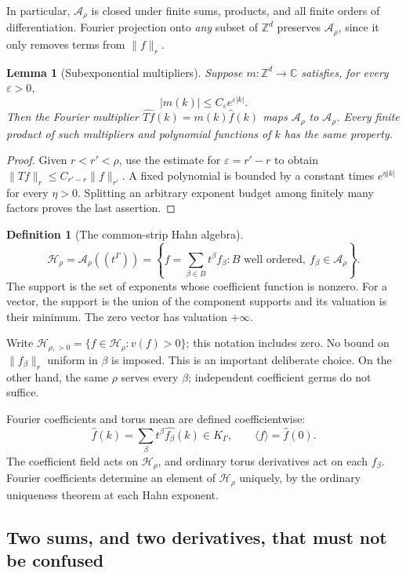 \documentclass[11pt,letterpaper]{article}
\newtheorem{lemma}[theorem]{Lemma}
\theoremstyle{definition}
\newtheorem{definition}[theorem]{Definition}
\theoremstyle{remark}
\newcommand{\C}{\mathbb C}
\newcommand{\Z}{\mathbb Z}
\newcommand{\A}{\mathcal A}
\newcommand{\HH}{\mathcal H}
\newcommand{\mean}[1]{\langle #1\rangle}
\newcommand{\eps}{\varepsilon}
\numberwithin{equation}{section}
\begin{document}
In particular, $\A_\rho$ is closed under finite sums, products, and all finite
orders of differentiation.  Fourier projection onto \emph{any} subset of
$\Z^d$ preserves $\A_\rho$, since it only removes terms from $\|f\|_r$.

\begin{lemma}[Subexponential multipliers]\label{lem:multiplier}
Suppose $m:\Z^d\to\C$ satisfies, for every $\eps>0$,
\[
 |m(k)|\le C_\eps e^{\eps|k|}.
\]
Then the Fourier multiplier $\widehat{Tf}(k)=m(k)\widehat f(k)$ maps
$\A_\rho$ to $\A_\rho$.  Every finite product of such multipliers and
polynomial functions of $k$ has the same property.
\end{lemma}
\begin{proof}
Given $r<r'<\rho$, use the estimate for $\eps=r'-r$ to obtain
$\|Tf\|_r\le C_{r'-r}\|f\|_{r'}$.  A fixed polynomial is bounded by a constant
times $e^{\eta|k|}$ for every $\eta>0$.  Splitting an arbitrary exponent
budget among finitely many factors proves the last assertion.
\end{proof}

\begin{definition}[The common-strip Hahn algebra]
\[
 \HH_\rho=\A_\rho((t^\Gamma))
 =\left\{f=\sum_{\beta\in B}t^\beta f_\beta:
          B\text{ well ordered},\ f_\beta\in\A_\rho\right\}.
\]
The support is the set of exponents whose coefficient function is nonzero.
For a vector, the support is the union of the component supports and its
valuation is their minimum.  The zero vector has valuation $+\infty$.
\end{definition}

Write $\HH_{\rho,>0}=\{f\in\HH_\rho:v(f)>0\}$; this notation includes zero.
No bound on $\|f_\beta\|_r$ uniform in $\beta$ is imposed.  This is an
important deliberate choice.  On the other hand, the same $\rho$ serves
every $\beta$; independent coefficient germs do not suffice.

Fourier coefficients and torus mean are defined coefficientwise:
\[
 \widehat f(k)=\sum_\beta t^\beta\widehat{f_\beta}(k)\in K_\Gamma,
 \qquad
 \mean f=\widehat f(0).
\]
The coefficient field acts on $\HH_\rho$, and ordinary torus derivatives act
on each $f_\beta$.  Fourier coefficients determine an element of $\HH_\rho$
uniquely, by the ordinary uniqueness theorem at each Hahn exponent.

\subsection{Two sums, and two derivatives, that must not be confused}
\end{document}
